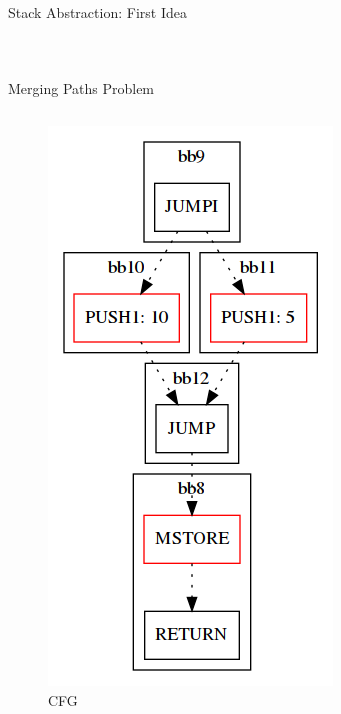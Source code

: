 \documentclass[11pt]{beamer}
\begin{document}
\begin{frame}{Stack Abstraction: First Idea}
\begin{columns}
{\begin{figure}
\end{figure}
}
\end{columns}
\end{frame}

\begin{frame}{Merging Paths Problem}
\begin{columns}
\begin{figure}
    \centering
    \includegraphics[scale=0.25]{figures/cfg_preAbstract.png}
    \caption{CFG}
\end{figure}
\begin{figure}
    \centering

\end{figure}
\end{columns}
\end{frame}
\end{document}
